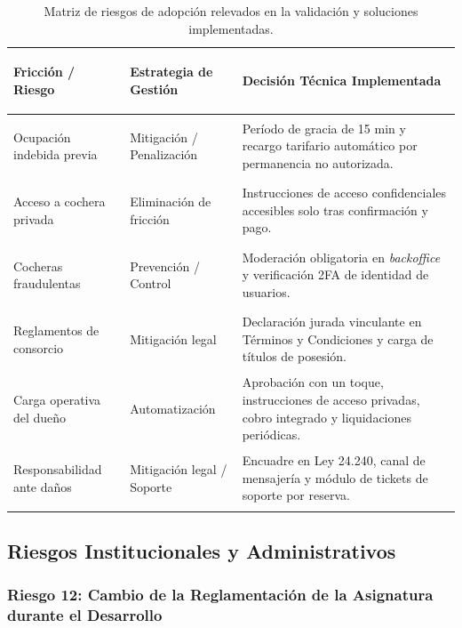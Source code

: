 \vspace{0.4cm}

\begin{table}[H]
\centering
\renewcommand{\arraystretch}{1.35}
\small
\begin{tabularx}{\textwidth}{>{\bfseries\raggedright\arraybackslash}p{4.2cm} >{\raggedright\arraybackslash}p{4.2cm} >{\raggedright\arraybackslash}X}
\toprule
\textbf{Fricción / Riesgo} & \textbf{Estrategia de Gestión} & \textbf{Decisión Técnica Implementada} \\
\midrule
Ocupación indebida previa & Mitigación / Penalización & Período de gracia de 15 min y recargo tarifario automático por permanencia no autorizada. \\
\rowcolor{plgray}
Acceso a cochera privada & Eliminación de fricción & Instrucciones de acceso confidenciales accesibles solo tras confirmación y pago. \\
Cocheras fraudulentas & Prevención / Control & Moderación obligatoria en \textit{backoffice} y verificación 2FA de identidad de usuarios. \\
\rowcolor{plgray}
Reglamentos de consorcio & Mitigación legal & Declaración jurada vinculante en Términos y Condiciones y carga de títulos de posesión. \\
Carga operativa del dueño & Automatización & Aprobación con un toque, instrucciones de acceso privadas, cobro integrado y liquidaciones periódicas. \\
\rowcolor{plgray}
Responsabilidad ante daños & Mitigación legal / Soporte & Encuadre en Ley 24.240, canal de mensajería y módulo de tickets de soporte por reserva. \\
\bottomrule
\end{tabularx}
\caption{Matriz de riesgos de adopción relevados en la validación y soluciones implementadas.}
\label{tab:encuesta_decisiones}
\end{table}

\subsection{Riesgos Institucionales y Administrativos}

\subsubsection{Riesgo 12: Cambio de la Reglamentación de la Asignatura durante el Desarrollo}

